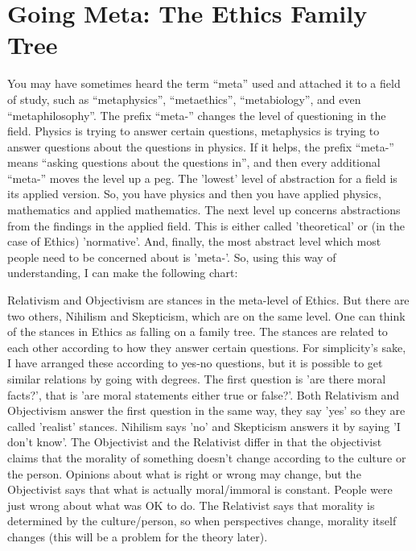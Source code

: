 \section{Going Meta: The Ethics Family Tree}  

You may have sometimes heard  the term “meta” used and attached it to a field of study, such as “metaphysics”, “metaethics”, “metabiology”, and even “metaphilosophy”. The prefix “meta-” changes the level of questioning in the field. Physics is trying to answer certain questions, metaphysics is trying to answer questions about the questions in physics. If it helps, the prefix “meta-” means “asking questions about the questions in”, and then every additional “meta-” moves the level up a peg. The 'lowest' level of abstraction for a field is its applied version. So, you have physics and then you have applied physics, mathematics and applied mathematics. The next level up concerns abstractions from the findings in the applied field. This is either called 'theoretical' or (in the case of Ethics) 'normative'. And, finally, the most abstract level which most people need to be concerned about is 'meta-'. So, using this way of understanding, I can make the following chart: 

\begin{center}
\end{center}

Relativism and Objectivism are stances in the meta-level of Ethics. But there are two others, Nihilism and Skepticism, which are on the same level. One can think of the stances in Ethics as falling on a family tree. The stances are related to each other according to how they answer certain questions. For simplicity's sake, I have arranged these according to yes-no questions, but it is possible to get similar relations by going with degrees. The first question is 'are there moral facts?', that is 'are moral statements either true or false?'. Both Relativism and Objectivism answer the first question in the same way, they say 'yes' so they are called 'realist' stances. Nihilism says 'no' and Skepticism answers it by saying 'I don't know'. The Objectivist and the Relativist differ in that the objectivist claims that the morality of something doesn't change according to the culture or the person. Opinions about what is right or wrong may change, but the Objectivist says that what is actually moral/immoral is constant. People were just wrong about what was OK to do. The Relativist says that morality is determined by the culture/person, so when perspectives change, morality itself changes (this will be a problem for the theory later). 

